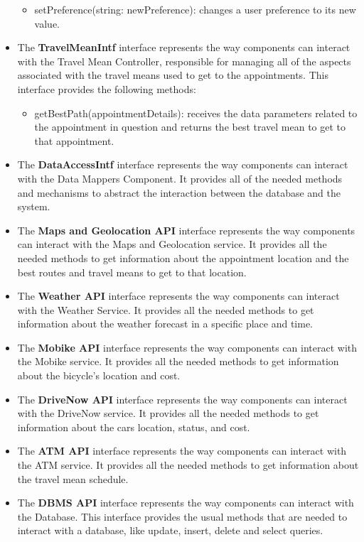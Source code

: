 \documentclass[12pt]{article}
\begin{document}
\begin{itemize}
\begin{itemize}
        \item setPreference(string: newPreference): changes a user preference to its new value.
    \end{itemize}
    \item The \textbf{TravelMeanIntf} interface represents the way components can interact with the Travel Mean Controller, responsible for managing all of the aspects associated with the travel means used to get to the appointments. This interface provides the following methods:
    \begin{itemize}
        \item getBestPath(appointmentDetails): receives the data parameters related to the appointment in question and returns the best travel mean to get to that appointment.
    \end{itemize}
    \item The \textbf{DataAccessIntf} interface represents the way components can interact with the Data Mappers Component. It provides all of the needed methods and mechanisms to abstract the interaction between the database and the system.
    \item The \textbf{Maps and Geolocation API} interface represents the way components can interact with the Maps and Geolocation service. It provides all the needed methods to get information about the appointment location and the best routes and travel means to get to that location.
    \item The \textbf{Weather API} interface represents the way components can interact with the Weather Service. It provides all the needed methods to get information about the weather forecast in a specific place and time.
    \item The \textbf{Mobike API} interface represents the way components can interact with the Mobike service. It provides all the needed methods to get information about the bicycle's location and cost.
    \item The \textbf{DriveNow API} interface represents the way components can interact with the DriveNow service. It provides all the needed methods to get information about the cars location, status, and cost.
    \item The \textbf{ATM API} interface represents the way components can interact with the ATM service. It provides all the needed methods to get information about the travel mean schedule.
    \item The \textbf{DBMS API} interface represents the way components can interact with the Database. This interface provides the usual methods that are needed to interact with a database, like update, insert, delete and select queries.
\end{itemize}
\end{document}

